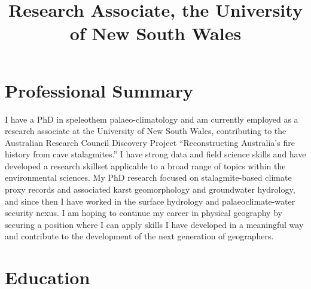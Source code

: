 \documentclass[11pt,a4paper,]{moderncv}
\title{Research Associate, the University of New South Wales}
\begin{document}
\makecvtitle



\hypertarget{professional-summary}{%
\section{Professional Summary}\label{professional-summary}}

I have a PhD in speleothem palaeo-climatology and am currently employed
as a research associate at the University of New South Wales,
contributing to the Australian Research Council Discovery Project
``Reconstructing Australia's fire history from cave stalagmites.'' I
have strong data and field science skills and have developed a research
skillset applicable to a broad range of topics within the environmental
sciences. My PhD research focused on stalagmite-based climate proxy
records and associated karst geomorphology and groundwater hydrology,
and since then I have worked in the surface hydrology and
palaeoclimate-water security nexus. I am hoping to continue my career in
physical geography by securing a position where I can apply skills I
have developed in a meaningful way and contribute to the development of
the next generation of geographers.

\hypertarget{education}{%
\section{Education}\label{education}}

\nopagebreak
    \nopagebreak
\end{document}
